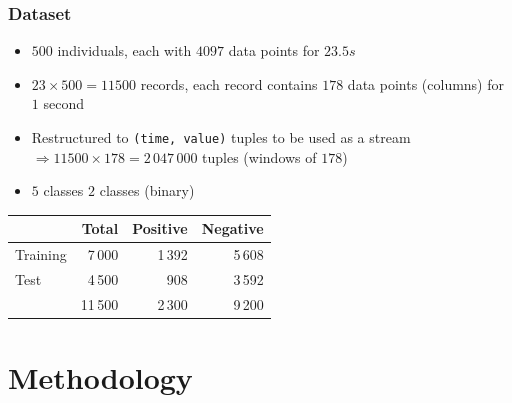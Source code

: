 \documentclass[xelatex,usenames,dvipsnames]{beamer}
\begin{document}
  \begin{frame}
    \frametitle{Dataset}
  \begin{itemize}
    \item \(500\) individuals, each with \(4097\) data points for \(23.5s\) %
    \item \(23 \times 500 = 11500\) records, each record contains \(178\) data points (columns) for \(1\) second
    \item Restructured to \texttt{(time, value)} tuples to be used as a stream \(\Rightarrow 11500 \times 178 = 2\,047\,000\) tuples (windows of \(178\))
    \item \(5\) classes \rightarrow \: \(2\) classes (binary)
  \end{itemize}

  \begin{table}
    {\begin{tabular}{@{} lrrr @{}}
      \toprule
       & Total & Positive & Negative\\
      \midrule
      Training & 7\,000 & 1\,392 & 5\,608\\
      Test & 4\,500& 908 & 3\,592\\
      \addlinespace
      & 11\,500 & 2\,300 & 9\,200\\
      \bottomrule
    \end{tabular}}
  \end{table}

  \end{frame}

  \section{Methodology}
\end{document}
